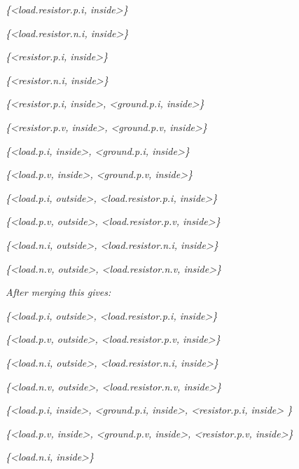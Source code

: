 \emph{\{\textless{}load.resistor.p.i, inside\textgreater{}\}}

\emph{\{\textless{}load.resistor.n.i, inside\textgreater{}\}}

\emph{\{\textless{}resistor.p.i, inside\textgreater{}\}}

\emph{\{\textless{}resistor.n.i, inside\textgreater{}\}}

\emph{\{\textless{}resistor.p.i, inside\textgreater{},
\textless{}ground.p.i, inside\textgreater{}\}}

\emph{\{\textless{}resistor.p.v, inside\textgreater{},
\textless{}ground.p.v, inside\textgreater{}\}}

\emph{\{\textless{}load.p.i, inside\textgreater{},
\textless{}ground.p.i, inside\textgreater{}\}}

\emph{\{\textless{}load.p.v, inside\textgreater{},
\textless{}ground.p.v, inside\textgreater{}\}}

\emph{\{\textless{}load.p.i, outside\textgreater{},
\textless{}load.resistor.p.i, inside\textgreater{}\}}

\emph{\{\textless{}load.p.v, outside\textgreater{},
\textless{}load.resistor.p.v, inside\textgreater{}\}}

\emph{\{\textless{}load.n.i, outside\textgreater{},
\textless{}load.resistor.n.i, inside\textgreater{}\}}

\emph{\{\textless{}load.n.v, outside\textgreater{},
\textless{}load.resistor.n.v, inside\textgreater{}\}}

\emph{After merging this gives:}

\emph{\{\textless{}load.p.i, outside\textgreater{},
\textless{}load.resistor.p.i, inside\textgreater{}\}}

\emph{\{\textless{}load.p.v, outside\textgreater{},
\textless{}load.resistor.p.v, inside\textgreater{}\}}

\emph{\{\textless{}load.n.i, outside\textgreater{},
\textless{}load.resistor.n.i, inside\textgreater{}\}}

\emph{\{\textless{}load.n.v, outside\textgreater{},
\textless{}load.resistor.n.v, inside\textgreater{}\}}

\emph{\{\textless{}load.p.i, inside\textgreater{},
\textless{}ground.p.i, inside\textgreater{}, \textless{}resistor.p.i,
inside\textgreater{} \}}

\emph{\{\textless{}load.p.v, inside\textgreater{},
\textless{}ground.p.v, inside\textgreater{}, \textless{}resistor.p.v,
inside\textgreater{}\}}

\emph{\{\textless{}load.n.i, inside\textgreater{}\}}

